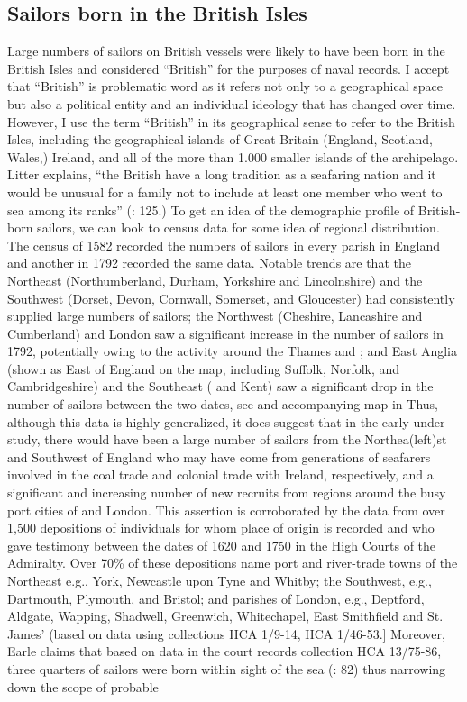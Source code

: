 \subsection{{Sailors born in the British Isles} }\label{sec:3.9.2}


Large numbers of sailors on British vessels were likely to have been born in the British Isles and considered “British” for the purposes of naval records. I accept that “British” is problematic word as it refers not only to a geographical space but also a political entity and an individual ideology that has changed over time. However, I use the term “British” in its geographical sense to refer to the British Isles, including the geographical islands of Great Britain (England, Scotland, Wales,) Ireland, and all of the more than 1.000 smaller islands of the archipelago. Litter explains, “the British have a long tradition as a seafaring nation and it would be unusual for a family not to include at least one member who went to sea among its ranks” (\citeyear*{Litter1999}: 125.) To get an idea of the demographic profile of British-born sailors, we can look to census data for some idea of regional distribution. The census of 1582 recorded the numbers of sailors in every parish in England \citep[246]{Bicheno2012} and another in 1792 recorded the same data. Notable trends are that the Northeast (Northumberland, Durham, Yorkshire and Lincolnshire) and the Southwest (Dorset, Devon, Cornwall, Somerset, and Gloucester) had consistently supplied large numbers of sailors; the Northwest (Cheshire, Lancashire and Cumberland) and London saw a significant increase in the number of sailors in 1792, potentially owing to the activity around the Thames and ; and East Anglia (shown as East of England on the map, including Suffolk, Norfolk, and Cambridgeshire) and the Southeast ( and Kent) saw a significant drop in the number of sailors between the two dates, see  and accompanying map in  Thus, although this data is highly generalized, it does suggest that in the early  under study, there would have been a large number of sailors from the Northea(left)st and Southwest of England who may have come from generations of seafarers involved in the coal trade and colonial trade with Ireland, respectively, and a significant and increasing number of new recruits from regions around the busy port cities of  and London. This assertion is corroborated by the data from over 1,500 depositions of individuals for whom place of origin is recorded and who gave testimony between the dates of 1620 and 1750 in the High Courts of the Admiralty. Over 70\% of these depositions name port and river-trade towns of the Northeast e.g., York, Newcastle upon Tyne and Whitby; the Southwest, e.g., Dartmouth, Plymouth, and Bristol; and parishes of London, e.g., Deptford, Aldgate, Wapping, Shadwell, Greenwich, Whitechapel, East Smithfield and St. James’ (based on  data using collections HCA 1/9-14, HCA 1/46-53.] Moreover, Earle claims that based on data in the court records collection HCA 13/75-86, three quarters of sailors were born within sight of the sea (\citeyear*{Earle1993}: 82) thus narrowing down the scope of probable 